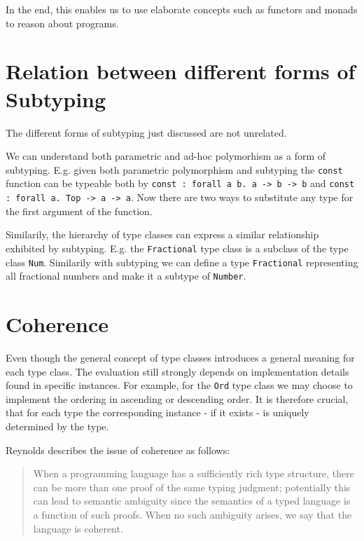 In the end, this enables us to use elaborate concepts such as functors and monads to reason about programs.

\cite{wadlerblott}

\section{Relation between different forms of Subtyping}\label{sec:relations}

The different forms of subtyping just discussed are not unrelated.

We can understand both parametric and ad-hoc polymorhism as a form of subtyping.
E.g. given both parametric polymorphism and subtyping the \texttt{const} function can be typeable both by
\texttt{const : forall a b. a -> b -> b} and \texttt{const : forall a. Top -> a -> a}.
Now there are two ways to substitute any type for the first argument of the function.

Similarily, the hierarchy of type classes can express a similar relationship exhibited by subtyping.
E.g. the \texttt{Fractional} type class is a subclass of the type class \texttt{Num}.
Similarily with subtyping we can define a type \texttt{Fractional} representing all fractional numbers and make it a subtype of \texttt{Number}.


\section{Coherence}\label{sec:coherence}

Even though the general concept of type classes introduces a general meaning for each type class.
The evaluation still strongly depends on implementation details found in specific instances.
For example, for the \texttt{Ord} type class we may choose to implement the ordering in ascending or descending order.
It is therefore crucial, that for each type the corresponding instance - if it exists - is uniquely determined by the type.

Reynolds \cite{reynolds_coherence} describes the issue of coherence as follows:

\begin{quote}
    When a programming language has a sufficiently rich type structure, there can be more than one proof of the same
    typing judgment; potentially this can lead to semantic ambiguity since the semantics of a typed language is a function
    of such proofs. When no such ambiguity arises, we say that the language is coherent.
\end{quote}

